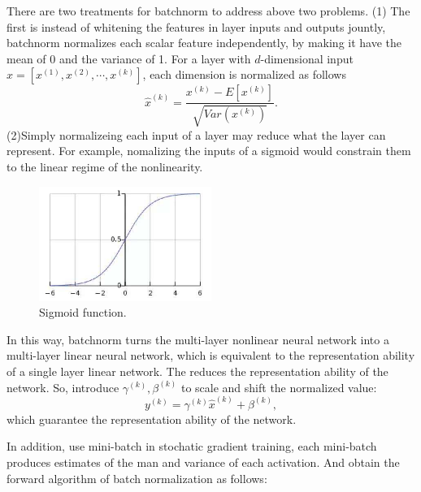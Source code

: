 \documentclass[10pt,onecolumn]{book}
\begin{document}
There are two treatments for batchnorm to address above two problems. (1) The first is instead of whitening the features in layer inputs and outputs jountly, batchnorm normalizes each scalar feature independently, by making it have the mean of 0 and the variance of 1. For a layer with $d$-dimensional input $x=[x^{(1)}, x^{(2)}, \cdots, x^{(k)}]$,  each dimension is normalized as follows 
\begin{equation}
\hat{x}^{(k)} = \frac{x^{(k)} - E[x^{(k)}]}{\sqrt{Var(x^{(k)})}}.
\end{equation}
(2)Simply normalizeing each input of a layer may reduce what the layer can represent. For example, nomalizing the inputs of a sigmoid would constrain them to the linear regime of the nonlinearity.
\begin{figure}[h]
\centering
\includegraphics[width=0.5\textwidth]{figures/sigmoid_batchnorm.png}
\caption{Sigmoid function.}
\end{figure}
In this way, batchnorm turns the multi-layer nonlinear neural network into a multi-layer linear neural network, which is equivalent to the representation ability of a single layer linear network. The reduces the representation ability of the network. So, introduce $\gamma ^ {(k)}, \beta^{(k)}$ to scale and shift the normalized value:
\begin{equation}
y^{(k)} = \gamma ^ {(k)} \hat{x} ^ {(k)} + \beta ^ {(k)},
\end{equation}
which guarantee the representation ability of the network.

In addition, use mini-batch in stochatic gradient training, each mini-batch produces estimates of the man and variance of each activation. And obtain the forward algorithm of batch normalization as follows: \\
\end{document}

